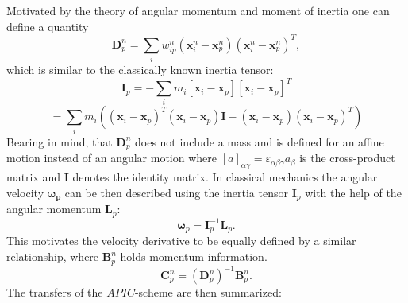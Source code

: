 \documentclass[m,times]{cgMA}
\begin{document}
Motivated by the theory of angular momentum and moment of inertia one can define a quantity
\begin{equation}
\boldsymbol { D } _ { p } ^ { n } = \sum _ { i } w _ { i p } ^ { n } ( \boldsymbol { x } _ { i } ^ { n } - \boldsymbol { x } _ { p } ^ { n } ) ( \boldsymbol { x } _ { i } ^ { n } - \boldsymbol { x } _ { p } ^ { n } ) ^ { T },
\end{equation}
which is similar to the classically known inertia tensor:
\begin{equation}
  \boldsymbol{I} _ { p } = - \sum _ { i } m _ { i } [\boldsymbol{x} _ { i }-\boldsymbol{x}_{p}][\boldsymbol{x} _ { i }-\boldsymbol{x}_{p}]^T
\end{equation}
$$
=
\sum _ { i } m _ { i }((\boldsymbol{x} _ { i }-\boldsymbol{x}_{p})^T(\boldsymbol{x} _ { i }-\boldsymbol{x}_{p})\boldsymbol{I} -(\boldsymbol{x} _ { i }-\boldsymbol{x}_{p})(\boldsymbol{x} _ { i }-\boldsymbol{x}_{p})^T)
$$
Bearing in mind, that $\boldsymbol{D}_p^n$ does not include a mass and is defined for an affine motion instead of an angular motion where $[a]_{\alpha\gamma} = \varepsilon_{\alpha\beta\gamma}a_{\beta}$ is the cross-product matrix and $\boldsymbol{I}$ denotes the identity matrix.
In classical mechanics the angular velocity $\boldsymbol{\omega_p}$ can be then described using the inertia tensor $\boldsymbol{I}_p$ with the help of the angular momentum $\boldsymbol{L}_p$:
\begin{equation}
  \boldsymbol{\omega}_p = \boldsymbol{I}_p^{-1} \boldsymbol{L}_p.
\end{equation}
This motivates the velocity derivative to be equally defined by a similar relationship, where $\boldsymbol{B}^n_p$ holds momentum information.
\begin{equation}
  \boldsymbol{C}^n_p = (\boldsymbol{D}_p^n)^{-1} \boldsymbol{B}^n_p.
\end{equation}
The transfers of the $APIC$-scheme are then summarized:
\end{document}
